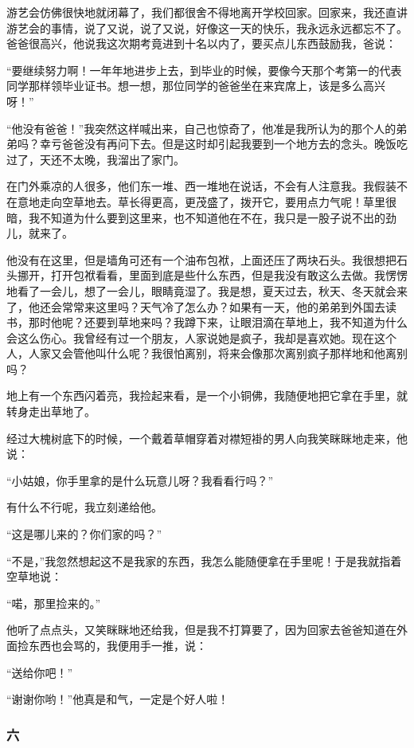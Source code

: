 \par 游艺会仿佛很快地就闭幕了，我们都很舍不得地离开学校回家。回家来，我还直讲游艺会的事情，说了又说，说了又说，好像这一天的快乐，我永远永远都忘不了。爸爸很高兴，他说我这次期考竟进到十名以内了，要买点儿东西鼓励我，爸说：
\par “要继续努力啊！一年年地进步上去，到毕业的时候，要像今天那个考第一的代表同学那样领毕业证书。想一想，那位同学的爸爸坐在来宾席上，该是多么高兴呀！”
\par “他没有爸爸！”我突然这样喊出来，自己也惊奇了，他准是我所认为的那个人的弟弟吗？幸亏爸爸没有再问下去。但是这时却引起我要到一个地方去的念头。晚饭吃过了，天还不太晚，我溜出了家门。
\par 在门外乘凉的人很多，他们东一堆、西一堆地在说话，不会有人注意我。我假装不在意地走向空草地去。草长得更高，更茂盛了，拨开它，要用点力气呢！草里很暗，我不知道为什么要到这里来，也不知道他在不在，我只是一股子说不出的劲儿，就来了。
\par 他没有在这里，但是墙角可还有一个油布包袱，上面还压了两块石头。我很想把石头挪开，打开包袱看看，里面到底是些什么东西，但是我没有敢这么去做。我愣愣地看了一会儿，想了一会儿，眼睛竟湿了。我是想，夏天过去，秋天、冬天就会来了，他还会常常来这里吗？天气冷了怎么办？如果有一天，他的弟弟到外国去读书，那时他呢？还要到草地来吗？我蹲下来，让眼泪滴在草地上，我不知道为什么会这么伤心。我曾经有过一个朋友，人家说她是疯子，我却是喜欢她。现在这个人，人家又会管他叫什么呢？我很怕离别，将来会像那次离别疯子那样地和他离别吗？
\par 地上有一个东西闪着亮，我捡起来看，是一个小铜佛，我随便地把它拿在手里，就转身走出草地了。
\par 经过大槐树底下的时候，一个戴着草帽穿着对襟短褂的男人向我笑眯眯地走来，他说：
\par “小姑娘，你手里拿的是什么玩意儿呀？我看看行吗？”
\par 有什么不行呢，我立刻递给他。
\par “这是哪儿来的？你们家的吗？”
\par “不是，”我忽然想起这不是我家的东西，我怎么能随便拿在手里呢！于是我就指着空草地说：
\par “喏，那里捡来的。”
\par 他听了点点头，又笑眯眯地还给我，但是我不打算要了，因为回家去爸爸知道在外面捡东西也会骂的，我便用手一推，说：
\par “送给你吧！”
\par “谢谢你哟！”他真是和气，一定是个好人啦！


\subsubsection*{六}


